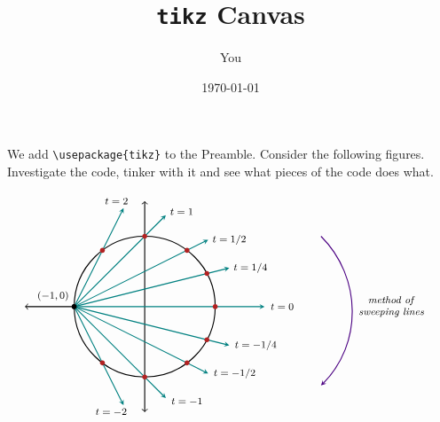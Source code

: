 \documentclass[11pt]{article}
\theoremstyle{definition}
\begin{document}
 
\title{\texttt{tikz} Canvas}
\author{You}
\date{\today} 
\maketitle


We add \verb!\usepackage{tikz}! to the Preamble. Consider the following figures. Investigate the code, tinker with it and see what pieces of the code does what.

\[\begin{tikzpicture}[scale=2]
    \draw[<-,thick] (-1.7,0)--(-1,0);
    \draw[<->,thick] (0,-1.5)--(0,1.5);
    \draw[thick](0,0) circle (1);
    \fill (-1,0) circle (1pt);
	\draw[->,thick,>=stealth, color=teal] (-1,0)--(-0.3,1.4); %
    \fill[color=firebrick] (-0.6,0.8) circle (1pt); %
    \draw[->,thick,>=stealth, color=teal] (-1,0)--(0.3,1.3); %
    \fill[color=firebrick] (0,1) circle (1pt); %
    \draw[->,thick,>=stealth, color=teal] (-1,0)--(0.9,0.95); %
    \fill[color=firebrick] (0.6,0.8) circle (1pt); %
    \draw[->,thick,>=stealth, color=teal] (-1,0)--(1.2,0.55); %
    \fill[color=firebrick] (0.882352941,0.470588235) circle (1pt); %
    \draw[->,thick,>=stealth, color=teal] (-1,0)--(1.7,0); %
    \fill[color=firebrick] (1,0) circle (1pt); %
	\draw[->,thick,>=stealth, color=teal] (-1,0)--(-0.3,-1.4); %
    \fill[color=firebrick] (-0.6,-0.8) circle (1pt); %
    \draw[->,thick,>=stealth, color=teal] (-1,0)--(0.3,-1.3); %
    \fill[color=firebrick] (0,-1) circle (1pt); %
    \draw[->,thick,>=stealth, color=teal] (-1,0)--(0.9,-0.95); %
    \fill[color=firebrick] (0.6,-0.8) circle (1pt); %
    \draw[->,thick,>=stealth, color=teal] (-1,0)--(1.2,-0.55); %
    \fill[color=firebrick] (0.882352941,-0.470588235) circle (1pt); %
    \fill (-1,0) circle (1pt);
	\node[] at (-1.3,0.15) {\footnotesize$(-1,0)$};
    \node[] at (-0.4,1.5) {\footnotesize $t=2$};
    \node[] at (-0.475,-1.5) {\footnotesize $t=-2$};
    \node[] at (0.525,1.35) {\footnotesize $t=1$};
    \node[] at (0.6,-1.35) {\footnotesize $t=-1$};
    \node[] at (1.2,0.95) {\footnotesize $t=1/2$};
    \node[] at (1.275,-0.95) {\footnotesize $t=-1/2$};
    \node[] at (1.5,0.55) {\footnotesize $t=1/4$};
    \node[] at (1.575,-0.55) {\footnotesize $t=-1/4$};
    \node[] at (1.95,0) {\footnotesize $t=0$};
	\draw[->,>=stealth,thick,color=indigo] (1.5,1) (2.5,1) arc(225:135:-1.5);
    \node[] at (3.5,0) {\footnotesize\begin{tabular}{c}\emph{method of}\\ \emph{sweeping lines}\end{tabular}};
\end{tikzpicture}\]
\end{document}
